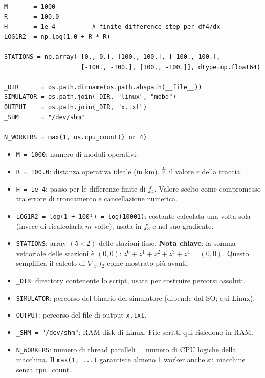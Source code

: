 \documentclass[12pt,a4paper]{article}
\theoremstyle{definition}
\newcommand{\grad}{\nabla}
\begin{document}
\begin{lstlisting}[caption={Righe 45–61 — Costanti del problema}]
M       = 1000
R       = 100.0
H       = 1e-4          # finite-difference step per df4/dx
LOG1R2  = np.log(1.0 + R * R)

STATIONS = np.array([[0., 0.], [100., 100.], [-100., 100.],
                     [-100., -100.], [100., -100.]], dtype=np.float64)

_DIR      = os.path.dirname(os.path.abspath(__file__))
SIMULATOR = os.path.join(_DIR, "linux", "mobd")
OUTPUT    = os.path.join(_DIR, "x.txt")
_SHM      = "/dev/shm"

N_WORKERS = max(1, os.cpu_count() or 4)
\end{lstlisting}

\begin{itemize}[nosep]
  \item \texttt{M = 1000}: numero di moduli operativi.
  \item \texttt{R = 100.0}: distanza operativa ideale (in km). È il valore $r$ della traccia.
  \item \texttt{H = 1e-4}: passo per le differenze finite di $f_4$.
        Valore scelto come compromesso tra errore di troncamento e cancellazione numerica.
  \item \texttt{LOG1R2 = log(1 + 100²) = log(10001)}: costante calcolata una volta sola
        (invece di ricalcolarla $m$ volte), usata in $f_3$ e nel suo gradiente.
  \item \texttt{STATIONS}: array $(5 \times 2)$ delle stazioni fisse.
        \textbf{Nota chiave}: la somma vettoriale delle stazioni è $(0,0)$:
        $z^0 + z^1 + z^2 + z^3 + z^4 = (0,0)$.
        Questo semplifica il calcolo di $\grad_{x^i} f_2$ come mostrato più avanti.
  \item \texttt{\_DIR}: directory contenente lo script, usata per costruire percorsi assoluti.
  \item \texttt{SIMULATOR}: percorso del binario del simulatore (dipende dal SO; qui Linux).
  \item \texttt{OUTPUT}: percorso del file di output \texttt{x.txt}.
  \item \texttt{\_SHM = "/dev/shm"}: RAM disk di Linux. File scritti qui risiedono in RAM.
  \item \texttt{N\_WORKERS}: numero di thread paralleli = numero di CPU logiche della macchina.
        Il \texttt{max(1, ...)} garantisce almeno 1 worker anche su macchine senza cpu\_count.
\end{itemize}
\end{document}
